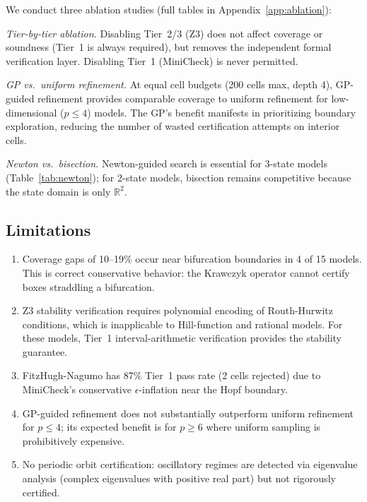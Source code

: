 \documentclass[11pt]{article}
\newcommand{\R}{\mathbb{R}}
\begin{document}
We conduct three ablation studies (full tables in Appendix~\ref{app:ablation}):

\emph{Tier-by-tier ablation.} Disabling Tier~2/3 (Z3) does not affect coverage or soundness (Tier~1 is always required), but removes the independent formal verification layer.  Disabling Tier~1 (MiniCheck) is never permitted.

\emph{GP vs.\ uniform refinement.} At equal cell budgets (200 cells max, depth 4), GP-guided refinement provides comparable coverage to uniform refinement for low-dimensional ($p \leq 4$) models.  The GP's benefit manifests in prioritizing boundary exploration, reducing the number of wasted certification attempts on interior cells.

\emph{Newton vs.\ bisection.} Newton-guided search is essential for 3-state models (Table~\ref{tab:newton}); for 2-state models, bisection remains competitive because the state domain is only $\R^2$.

\subsection{Limitations}

\begin{enumerate}[leftmargin=*]
\item Coverage gaps of 10--19\% occur near bifurcation boundaries in 4 of 15 models.  This is correct conservative behavior: the Krawczyk operator cannot certify boxes straddling a bifurcation.

\item Z3 stability verification requires polynomial encoding of Routh-Hurwitz conditions, which is inapplicable to Hill-function and rational models.  For these models, Tier~1 interval-arithmetic verification provides the stability guarantee.

\item FitzHugh-Nagumo has 87\% Tier~1 pass rate (2 cells rejected) due to MiniCheck's conservative $\epsilon$-inflation near the Hopf boundary.

\item GP-guided refinement does not substantially outperform uniform refinement for $p \leq 4$; its expected benefit is for $p \geq 6$ where uniform sampling is prohibitively expensive.

\item No periodic orbit certification: oscillatory regimes are detected via eigenvalue analysis (complex eigenvalues with positive real part) but not rigorously certified.
\end{enumerate}
\end{document}
